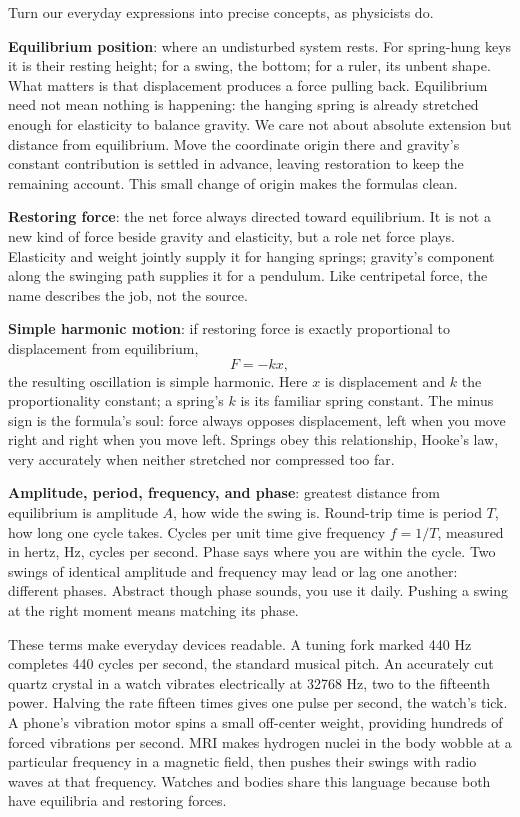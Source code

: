 
Turn our everyday expressions into precise concepts, as physicists do.

\textbf{Equilibrium position}: where an undisturbed system rests. For spring-hung keys it is their resting height; for a swing, the bottom; for a ruler, its unbent shape. What matters is that displacement produces a force pulling back. Equilibrium need not mean nothing is happening: the hanging spring is already stretched enough for elasticity to balance gravity. We care not about absolute extension but distance from equilibrium. Move the coordinate origin there and gravity's constant contribution is settled in advance, leaving restoration to keep the remaining account. This small change of origin makes the formulas clean.

\textbf{Restoring force}: the net force always directed toward equilibrium. It is not a new kind of force beside gravity and elasticity, but a role net force plays. Elasticity and weight jointly supply it for hanging springs; gravity's component along the swinging path supplies it for a pendulum. Like centripetal force, the name describes the job, not the source.

\textbf{Simple harmonic motion}: if restoring force is exactly proportional to displacement from equilibrium,
\[
  F = -kx,
\]
the resulting oscillation is simple harmonic. Here \(x\) is displacement and \(k\) the proportionality constant; a spring's \(k\) is its familiar spring constant. The minus sign is the formula's soul: force always opposes displacement, left when you move right and right when you move left. Springs obey this relationship, Hooke's law, very accurately when neither stretched nor compressed too far.

\textbf{Amplitude, period, frequency, and phase}: greatest distance from equilibrium is amplitude \(A\), how wide the swing is. Round-trip time is period \(T\), how long one cycle takes. Cycles per unit time give frequency \(f=1/T\), measured in hertz, Hz, cycles per second. Phase says where you are within the cycle. Two swings of identical amplitude and frequency may lead or lag one another: different phases. Abstract though phase sounds, you use it daily. Pushing a swing at the right moment means matching its phase.

These terms make everyday devices readable. A tuning fork marked 440 Hz completes 440 cycles per second, the standard musical pitch. An accurately cut quartz crystal in a watch vibrates electrically at 32768 Hz, two to the fifteenth power. Halving the rate fifteen times gives one pulse per second, the watch's tick. A phone's vibration motor spins a small off-center weight, providing hundreds of forced vibrations per second. MRI makes hydrogen nuclei in the body wobble at a particular frequency in a magnetic field, then pushes their swings with radio waves at that frequency. Watches and bodies share this language because both have equilibria and restoring forces.

